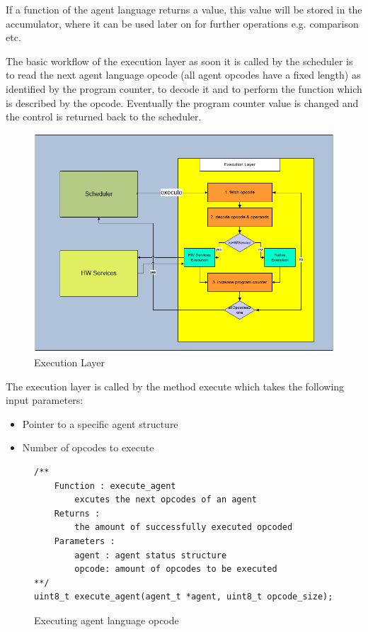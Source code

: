 \documentclass{scrreprt}
\begin{document}
\noindent
If a function of the agent language returns a value, this value will be stored in the accumulator, 
where it can be used later on for further operations e.g. comparison etc. 


\noindent
The basic workflow of the execution layer as soon it is called by the scheduler is to read the next 
agent language opcode (all agent opcodes have a fixed length) as identified by the program counter, 
to decode it and to perform the function which is described by the opcode. Eventually the program 
counter value is changed and the control is returned back to the scheduler. 

\begin{figure}[!htbp]
\begin{center}
\includegraphics[scale=0.4]{figures/exelayer.png}
\caption{Execution Layer}
\end{center}
\label{exelayer}
\end{figure}



The execution layer is 
called by the method execute which takes the following input parameters:
\begin{itemize}
 \item Pointer to a specific agent structure
 \item Number of opcodes to execute
\end{itemize}

\begin{figure}[!htb]
\lstset{language=C}
\begin{lstlisting}[frame=single]
/**
	Function : execute_agent
		excutes the next opcodes of an agent
	Returns : 
		the amount of successfully executed opcoded
	Parameters : 
		agent : agent status structure
		opcode: amount of opcodes to be executed
**/
uint8_t execute_agent(agent_t *agent, uint8_t opcode_size);
\end{lstlisting}
\caption{Executing agent language opcode}
\label{fig:excopc}
\end{figure}
\end{document}
